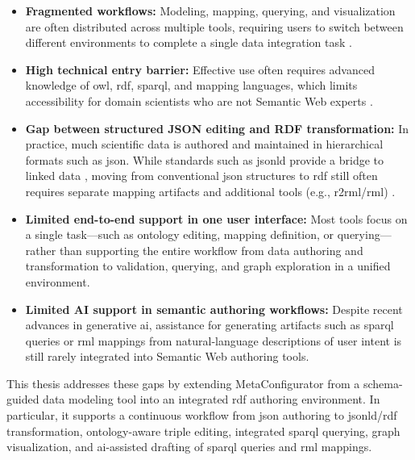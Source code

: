 \begin{itemize}
    \item \textbf{Fragmented workflows:} Modeling, mapping, querying, and visualization are often distributed across multiple tools, requiring users to switch between different environments to complete a single data integration task \cite{hogan2021knowledgegraphs}.

    \item \textbf{High technical entry barrier:} Effective use often requires advanced knowledge of \gls{owl}, \gls{rdf}, \gls{sparql}, and mapping languages, which limits accessibility for domain scientists who are not Semantic Web experts \cite{janowicz2015geospatial}.

    \item \textbf{Gap between structured JSON editing and RDF transformation:} In practice, much scientific data is authored and maintained in hierarchical formats such as \gls{json}. While standards such as \gls{jsonld} provide a bridge to linked data \cite{jsonld2014}, moving from conventional \gls{json} structures to \gls{rdf} still often requires separate mapping artifacts and additional tools (e.g., \gls{r2rml}/\gls{rml}) \cite{das2012r2rml,dimou2014rml}.

    \item \textbf{Limited end-to-end support in one user interface:} Most tools focus on a single task—such as ontology editing, mapping definition, or querying—rather than supporting the entire workflow from data authoring and transformation to validation, querying, and graph exploration in a unified environment.

    \item \textbf{Limited AI support in semantic authoring workflows:} Despite recent advances in generative \gls{ai}, assistance for generating artifacts such as \gls{sparql} queries or \gls{rml} mappings from natural-language descriptions of user intent is still rarely integrated into Semantic Web authoring tools.
\end{itemize}

This thesis addresses these gaps by extending MetaConfigurator from a schema-guided data modeling tool into an integrated \gls{rdf} authoring environment. In particular, it supports a continuous workflow from \gls{json} authoring to \gls{jsonld}/\gls{rdf} transformation, ontology-aware triple editing, integrated \gls{sparql} querying, graph visualization, and \gls{ai}-assisted drafting of \gls{sparql} queries and \gls{rml} mappings.
